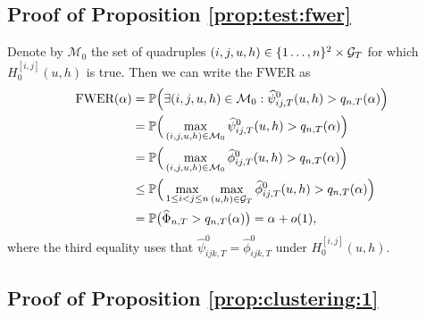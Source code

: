 \documentclass[12pt]{article}
\begin{document}
\subsection*{Proof of Proposition \ref{prop:test:fwer}}\label{subsec:app:fwer}


Denote by $\mathcal{M}_0$ the set of quadruples $(i, j, u, h) \in \{1\ldots, n\}^2 \times \mathcal{G}_T$ for which $H_0^{[i, j]}(u, h)$ is true. Then we can write the $\text{FWER}$ as
\begin{align*}
\text{FWER}(\alpha)
 & = \mathbb{P} \Big( \exists (i,j,u, h) \in \mathcal{M}_0: \widehat{\psi}^0_{ij,T}(u, h) > q_{n, T}(\alpha) \Big) \\
 & = \mathbb{P} \Big( \max_{(i, j, u, h) \in \mathcal{M}_0} \widehat{\psi}^0_{ij,T}(u, h) > q_{n, T}(\alpha) \Big) \\
 & = \mathbb{P} \Big( \max_{(i,j,u, h) \in \mathcal{M}_0} \widehat{\phi}^0_{ij,T}(u, h) > q_{n, T}(\alpha) \Big) \\
 & \le \mathbb{P} \Big( \max_{1 \le i < j \le n} \max_{(u, h) \in \mathcal{G}_T} \widehat{\phi}_{ij,T}^0(u, h) > q_{n, T}(\alpha) \Big) \\
 & = \mathbb{P} \big( \widehat{\Phi}_{n, T} > q_{n, T}(\alpha) \big) = \alpha + o(1),
\end{align*}
where the third equality uses that $\widehat{\psi}^0_{ijk,T} = \widehat{\phi}^0_{ijk,T}$ under $H_0^{[i, j]}(u, h)$.



\subsection*{Proof of Proposition \ref{prop:clustering:1}}
\end{document}
